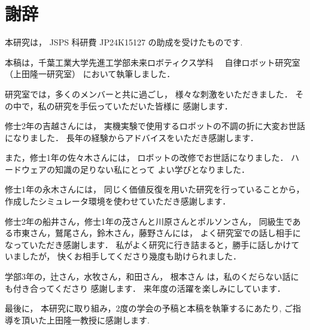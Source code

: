 \chapter*{謝辞}

本研究は， JSPS 科研費 JP24K15127 の助成を受けたものです.

本稿は，千葉工業大学先進工学部未来ロボティクス学科
　自律ロボット研究室（上田隆一研究室）
において執筆しました．

研究室では，多くのメンバーと共に過ごし，
様々な刺激をいただきました．
その中で，私の研究を手伝っていただいた皆様に
感謝します．

修士2年の吉越さんには，
実機実験で使用するロボットの不調の折に大変お世話になりました．
長年の経験からアドバイスをいただき感謝します．

また，修士1年の佐々木さんには，
ロボットの改修でお世話になりました．
ハードウェアの知識の足りない私にとって
よい学びとなりました．

修士1年の永木さんには，
同じく価値反復を用いた研究を行っていることから，
作成したシミュレータ環境を使わせていただき感謝します．

修士2年の船井さん，修士1年の茂さんと川原さんとポルソンさん，
同級生である市東さん，鷲尾さん，鈴木さん，藤野さんには，
よく研究室での話し相手になっていただき感謝します．
私がよく研究に行き詰まると，勝手に話しかけていましたが，
快くお相手してくださり幾度も助けられました．

学部3年の，辻さん，水牧さん，和田さん，
根本さん
は，私のくだらない話にも付き合ってくださり
感謝します．
来年度の活躍を楽しみにしています．


最後に，
本研究に取り組み，2度の学会の予稿と本稿を執筆するにあたり, 
ご指導を頂いた上田隆一教授に感謝します.


